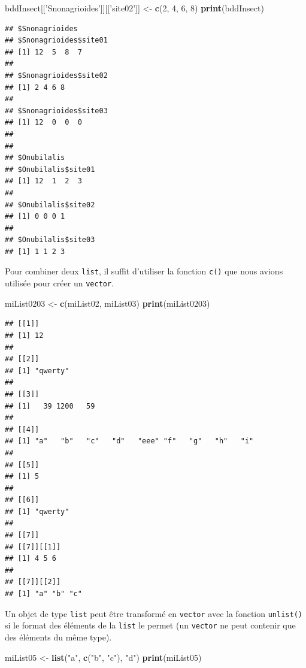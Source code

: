 \documentclass[twoside,symmetric]{book}
\newenvironment{Shaded}{}{}
\newcommand{\DecValTok}[1]{#1}
\newcommand{\KeywordTok}[1]{\textbf{#1}}
\newcommand{\NormalTok}[1]{#1}
\newcommand{\StringTok}[1]{#1}
\begin{document}
\begin{Shaded}
\begin{Highlighting}[]
\NormalTok{bddInsect[[}\StringTok{'Snonagrioides'}\NormalTok{]][[}\StringTok{'site02'}\NormalTok{]] <-}\StringTok{ }\KeywordTok{c}\NormalTok{(}\DecValTok{2}\NormalTok{, }\DecValTok{4}\NormalTok{, }\DecValTok{6}\NormalTok{, }\DecValTok{8}\NormalTok{)}
\KeywordTok{print}\NormalTok{(bddInsect)}
\end{Highlighting}
\end{Shaded}

\begin{verbatim}
## $Snonagrioides
## $Snonagrioides$site01
## [1] 12  5  8  7
## 
## $Snonagrioides$site02
## [1] 2 4 6 8
## 
## $Snonagrioides$site03
## [1] 12  0  0  0
## 
## 
## $Onubilalis
## $Onubilalis$site01
## [1] 12  1  2  3
## 
## $Onubilalis$site02
## [1] 0 0 0 1
## 
## $Onubilalis$site03
## [1] 1 1 2 3
\end{verbatim}

Pour combiner deux \texttt{list}, il suffit d'utiliser la fonction \texttt{c()} que nous avions utilisée pour créer un \texttt{vector}.

\begin{Shaded}
\begin{Highlighting}[]
\NormalTok{miList0203 <-}\StringTok{ }\KeywordTok{c}\NormalTok{(miList02, miList03)}
\KeywordTok{print}\NormalTok{(miList0203)}
\end{Highlighting}
\end{Shaded}

\begin{verbatim}
## [[1]]
## [1] 12
## 
## [[2]]
## [1] "qwerty"
## 
## [[3]]
## [1]   39 1200   59
## 
## [[4]]
## [1] "a"   "b"   "c"   "d"   "eee" "f"   "g"   "h"   "i"  
## 
## [[5]]
## [1] 5
## 
## [[6]]
## [1] "qwerty"
## 
## [[7]]
## [[7]][[1]]
## [1] 4 5 6
## 
## [[7]][[2]]
## [1] "a" "b" "c"
\end{verbatim}

Un objet de type \texttt{list} peut être transformé en \texttt{vector} avec la fonction \texttt{unlist()} si le format des éléments de la \texttt{list} le permet (un \texttt{vector} ne peut contenir que des éléments du même type).

\begin{Shaded}
\begin{Highlighting}[]
\NormalTok{miList05 <-}\StringTok{ }\KeywordTok{list}\NormalTok{(}\StringTok{"a"}\NormalTok{, }\KeywordTok{c}\NormalTok{(}\StringTok{"b"}\NormalTok{, }\StringTok{"c"}\NormalTok{), }\StringTok{"d"}\NormalTok{)}
\KeywordTok{print}\NormalTok{(miList05)}
\end{Highlighting}
\end{Shaded}
\end{document}
